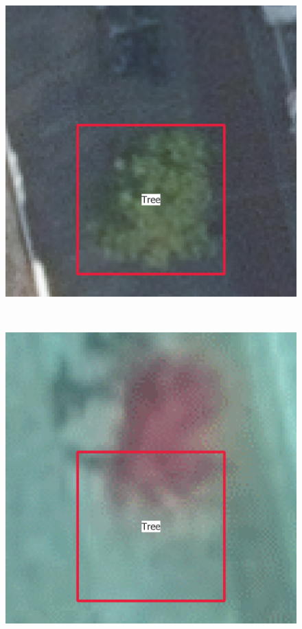 \documentclass[
  letterpaper,
  DIV=11,
  numbers=noendperiod]{scrartcl}
\begin{document}
\begin{figure}

\begin{minipage}{0.48\linewidth}

\includegraphics{images/Data_shift/RGB_image.png}

\end{minipage}%
%
\begin{minipage}{0.04\linewidth}
~\end{minipage}%
%
\begin{minipage}{0.48\linewidth}

\includegraphics{images/Data_shift/CIR_image.png}


\end{minipage}
\end{figure}
\end{document}
